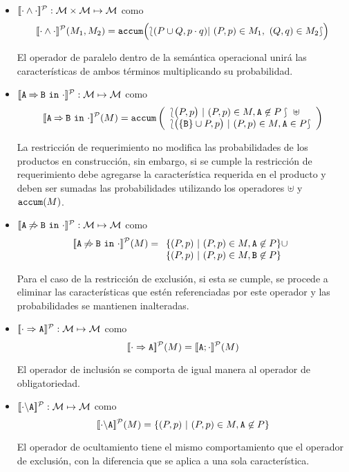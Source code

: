 \begin{itemize}
  \item 
    $[\![\cdot\mathbin{\wedge}\cdot]\!]^{\cal P}:{\cal M}\times{\cal M}\mapsto{\cal M}$
    como 
    $$
        [\![\cdot\mathbin{\wedge}\cdot]\!]^{\cal P}(M_{1},M_{2})= \mathtt{accum}\Bigl(
                \lbag (P\cup Q, p\cdot q)  |\ (P,p) \in M_{1},\ (Q,q) \in M_{2}\rbag\Bigr)
    $$
    
  El operador de paralelo dentro de la semántica operacional unirá las características
  de ambos términos multiplicando su probabilidad.
     
  \item  
    $[\![\mathtt{A}\mathbin{\Rightarrow}\mathtt{B}\ \mathtt{in}\ \cdot]\!]^{\cal P}:{\cal M}\mapsto{\cal M}$
    como 
    $$\semdenp{\require{A}{B}{\cdot}}(M)=\accum\left(\begin{array}{l}
      \lbag\bigl(P,p\bigr)\ |\  (P,p)\in M, \feature{A}\not\in P\rbag\ \uplus\\
      \lbag\bigl(\{\feature{B}\}\cup P ,p\bigr)\ |\ (P,p)\in M, \feature{A}\in P\rbag \\ 
      \end{array}\right)$$

  La restricción de requerimiento no modifica las probabilidades de los productos en
  construcción, sin embargo, si se cumple la restricción de requerimiento debe agregarse
  la característica requerida en el producto y deben ser sumadas las probabilidades utilizando
  los operadores $\uplus$ y $\mathtt{accum}(M)$.
      
  \item  
    $[\![\mathtt{A}\mathbin{\not\Rightarrow}\mathtt{B}\ \mathtt{in}\ \cdot]\!]^{\cal P}:{\cal M}\mapsto{\cal M}$
    como 
    $$[\![\mathtt{A}\mathbin{\not\Rightarrow}\mathtt{B}\ \mathtt{in}\ \cdot]\!]^{\cal P}(M)=\begin{array}[t]{l}
      \{(P,p)\ |\ (P,p)\in M, \mathtt{A}\not\in P\}\cup\\
      \{(P,p)\ |\ (P,p)\in M, \mathtt{B}\not\in P\}
      \end{array}$$

  Para el caso de la restricción de exclusión, si esta se cumple, se
  procede a eliminar las características que estén referenciadas por
  este operador y las probabilidades se mantienen inalteradas.
  
    \item $[\![\cdot\Rightarrow\mathtt{A}]\!]^{\cal P}:{\cal M}\mapsto{\cal M}$
    como 
    $$[\![\cdot\Rightarrow\mathtt{A}]\!]^{\cal P}(M) = [\![\mathtt{A};{\cdot}]\!]^{\cal P}(M)
    $$

  El operador de inclusión se comporta de igual manera al operador de
  obligatoriedad.
  
    \item   $[\![\cdot\backslash\mathtt{A}]\!]^{\cal P}:{\cal M}\mapsto{\cal M}$
    como 
    $$[\![\cdot\backslash\mathtt{A}]\!]^{\cal P}(M) = \{(P,p)\ |\ (P, p) \in M, \mathtt{A}\not\in P      \}$$

  El operador de ocultamiento tiene el mismo comportamiento que el operador de
  exclusión, con la diferencia que se aplica a una sola característica.

  \end{itemize}
\edfn

